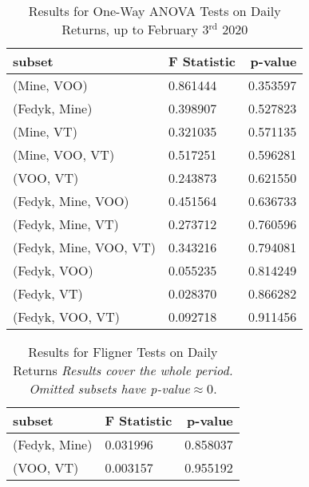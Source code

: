 \begin{appendices}
\begin{table}[ht]
\centering
\caption{Results for One-Way ANOVA Tests on Daily Returns, up to February 3$^\text{rd}$ 2020}
    \begin{tabular}{l|ll}
    \toprule
        \textbf{subset}        & \multicolumn{1}{r}{\textbf{F Statistic}} & \multicolumn{1}{r}{\textbf{p-value}} \\ \midrule
        (Mine, VOO)                         & 0.861444                       & 0.353597                               \\
        (Fedyk, Mine)                       & 0.398907                       & 0.527823                               \\
        (Mine, VT)                          & 0.321035                       & 0.571135                               \\
        (Mine, VOO, VT)                     & 0.517251                       & 0.596281                               \\
        (VOO, VT)                           & 0.243873                       & 0.621550                               \\
        (Fedyk, Mine, VOO)                  & 0.451564                       & 0.636733                               \\
        (Fedyk, Mine, VT)                   & 0.273712                       & 0.760596                               \\
        (Fedyk, Mine, VOO, VT)              & 0.343216                       & 0.794081                               \\
        (Fedyk, VOO)                        & 0.055235                       & 0.814249                               \\
        (Fedyk, VT)                         & 0.028370                       & 0.866282                               \\
        (Fedyk, VOO, VT)                    & 0.092718                       & 0.911456                              
    \end{tabular}
\label{tab:anova_before}
\end{table}


\begin{table}[ht]
\centering
\caption{Results for Fligner Tests on Daily Returns
\newline \footnotesize{\textit{Results cover the whole period. Omitted subsets have p-value$\approx0$}.}}
    \begin{tabular}{l|ll}
    \toprule
    \textbf{subset}        & \multicolumn{1}{r}{\textbf{F Statistic}} & \multicolumn{1}{r}{\textbf{p-value}} \\ \midrule
    (Fedyk, Mine)                       & 0.031996                       & 0.858037                       \\
    (VOO, VT)                           & 0.003157                       & 0.955192                      
    \end{tabular}
\label{tab:fligner_all}
\end{table}


\end{appendices}
